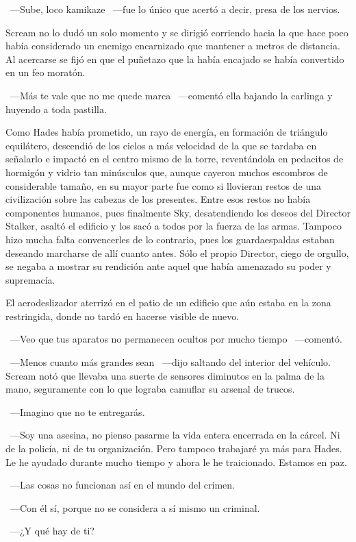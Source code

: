 ~---Sube, loco kamikaze ~---fue lo único que acertó a decir, presa de los nervios.

Scream no lo dudó un solo momento y se dirigió corriendo hacia la que hace poco había considerado un enemigo encarnizado que mantener a metros de distancia. Al acercarse se fijó en que el puñetazo que la había encajado se había convertido en un feo moratón.

~---Más te vale que no me quede marca ~---comentó ella bajando la carlinga y huyendo a toda pastilla.

Como Hades había prometido, un rayo de energía, en formación de triángulo equilátero, descendió de los cielos a más velocidad de la que se tardaba en señalarlo e impactó en el centro mismo de la torre, reventándola en pedacitos de hormigón y vidrio tan minúsculos que, aunque cayeron muchos escombros de considerable tamaño, en su mayor parte fue como si llovieran restos de una civilización sobre las cabezas de los presentes. Entre esos restos no había componentes humanos, pues finalmente Sky, desatendiendo los deseos del Director Stalker, asaltó el edificio y los sacó a todos por la fuerza de las armas. Tampoco hizo mucha falta convencerles de lo contrario, pues los guardaespaldas estaban deseando marcharse de allí cuanto antes. Sólo el propio Director, ciego de orgullo, se negaba a mostrar su rendición ante aquel que había amenazado su poder y supremacía.

El aerodeslizador aterrizó en el patio de un edificio que aún estaba en la zona restringida, donde no tardó en hacerse visible de nuevo.

~---Veo que tus aparatos no permanecen ocultos por mucho tiempo ~---comentó.

~---Menos cuanto más grandes sean ~---dijo saltando del interior del vehículo. Scream notó que llevaba una suerte de sensores diminutos en la palma de la mano, seguramente con lo que lograba camuflar su arsenal de trucos.

~---Imagino que no te entregarás.

~---Soy una asesina, no pienso pasarme la vida entera encerrada en la cárcel. Ni de la policía, ni de tu organización. Pero tampoco trabajaré ya más para Hades. Le he ayudado durante mucho tiempo y ahora le he traicionado. Estamos en paz.

~---Las cosas no funcionan así en el mundo del crimen.

~---Con él sí, porque no se considera a sí mismo un criminal.

~---¿Y qué hay de ti?


